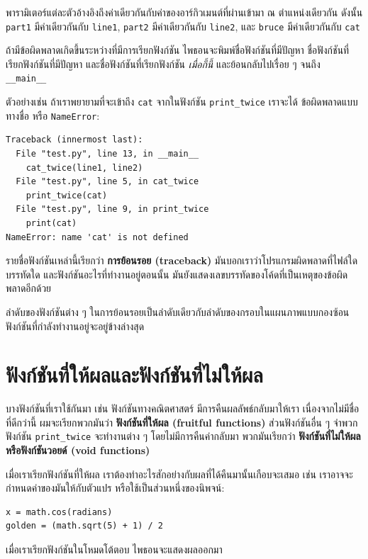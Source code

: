 พารามิเตอร์แต่ละตัวอ้างอิงถึงค่าเดียวกันกับค่าของอาร์กิวเมนต์ที่ผ่านเข้ามา ณ ตำแหน่งเดียวกัน
ดังนั้น {\tt part1} มีค่าเดียวกันกับ {\tt line1}, {\tt part2} มีค่าเดียวกันกับ {\tt line2},
และ {\tt bruce} มีค่าเดียวกันกับ {\tt cat}

ถ้ามีข้อผิดพลาดเกิดขึ้นระหว่างที่มีการเรียกฟังก์ชัน ไพธอนจะพิมพ์ชื่อฟังก์ชันที่มีปัญหา ชื่อฟังก์ชันที่เรียกฟังก์ชันที่มีปัญหา 
และชื่อฟังก์ชันที่เรียกฟังก์ชัน {\em เมื่อกี้นี้} และย้อนกลับไปเรื่อย ๆ จนถึง \verb"__main__"

ตัวอย่างเช่น ถ้าเราพยายามที่จะเข้าถึง {\tt cat} จากในฟังก์ชัน \verb|print_twice| เราจะได้
ข้อผิดพลาดแบบทางชื่อ หรือ {\tt NameError}:

\begin{verbatim}
Traceback (innermost last):
  File "test.py", line 13, in __main__
    cat_twice(line1, line2)
  File "test.py", line 5, in cat_twice
    print_twice(cat)
  File "test.py", line 9, in print_twice
    print(cat)
NameError: name 'cat' is not defined
\end{verbatim}
%
รายชื่อฟังก์ชันเหล่านี้เรียกว่า {\bf การย้อนรอย (traceback)} มันบอกเราว่าโปรแกรมผิดพลาดที่ไฟล์ใด
บรรทัดใด และฟังก์ชันอะไรที่ทำงานอยู่ตอนนั้น  มันยังแสดงเลขบรรทัดของโค้ดที่เป็นเหตุของข้อผิดพลาดอีกด้วย

ลำดับของฟังก์ชันต่าง ๆ ในการย้อนรอยเป็นลำดับเดียวกับลำดับของกรอบในแผนภาพแบบกองซ้อน
ฟังก์ชันที่กำลังทำงานอยู่จะอยู่ข้างล่างสุด 


\section{ฟังก์ชันที่ให้ผลและฟังก์ชันที่ไม่ให้ผล} %

บางฟังก์ชันที่เราใช้กันมา เช่น ฟังก์ชันทางคณิตศาสตร์ มีการคืนผลลัพธ์กลับมาให้เรา  เนื่องจากไม่มีชื่อที่ดีกว่านี้
ผมจะเรียกพวกมันว่า {\bf ฟังก์ชันที่ให้ผล (fruitful functions)}  ส่วนฟังก์ชันอื่น ๆ จำพวกฟังก์ชัน 
\verb|print_twice| จะทำงานต่าง ๆ โดยไม่มีการคืนค่ากลับมา พวกมันเรียกว่า 
{\bf ฟังก์ชันที่ไม่ให้ผล หรือฟังก์ชันวอยด์ (void functions)} 

เมื่อเราเรียกฟังก์ชันที่ให้ผล เราต้องทำอะไรสักอย่างกับผลที่ได้คืนมานั้นเกือบจะเสมอ เช่น 
เราอาจจะกำหนดค่าของมันให้กับตัวแปร หรือใช้เป็นส่วนหนึ่งของนิพจน์:

\begin{verbatim}
x = math.cos(radians)
golden = (math.sqrt(5) + 1) / 2
\end{verbatim}
%
เมื่อเราเรียกฟังก์ชันในโหมดโต้ตอบ ไพธอนจะแสดงผลออกมา

